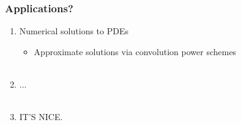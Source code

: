 \documentclass{beamer}
\theoremstyle{definition}
\begin{document}
\begin{frame}
\frametitle{Applications?}

\begin{enumerate}
	\item Numerical solutions to PDEs
	\begin{itemize}
		\item Approximate solutions via convolution power schemes\\
		$\,$\\
	\end{itemize}


	\item $\dots$\\
	$\,$\\
	
\pause


	\item IT'S NICE.
\end{enumerate}

\end{frame}
\end{document}
